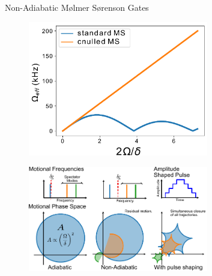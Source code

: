 \documentclass[final]{beamer}
\begin{document}
\begin{frame}{}
\begin{center}
\begin{columns}[t]
\begin{column}{0.49\textwidth}
\begin{alertblock}{Non-Adiabatic Mølmer Sørenson Gates}
\begin{minipage}{0.58\textwidth}
\begin{itemize}
      \end{itemize}
      \end{minipage}
      \begin{minipage}{0.38\textwidth}
      \begin{figure}
        \includegraphics[width=0.7\textwidth]{./figs/J0J2theory.pdf}
      \end{figure}
      \end{minipage}
      \begin{figure}
        \includegraphics[width=0.7\textwidth]{./figs/phase_loops_fig_bumpy.pdf}
      \end{figure}



\end{alertblock}
\end{column}
\end{columns}
\end{center}
\end{frame}
\end{document}
